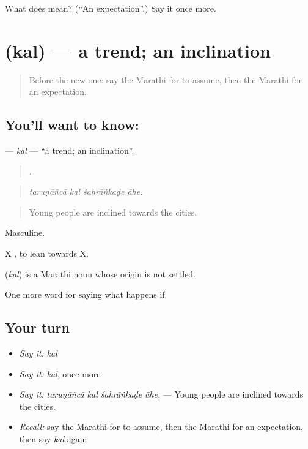 \begin{tcolorbox}[breakable,colback=teal!4,colframe=teal!35!black,title={Before you move on}]
What does  mean? (\textquotedblleft{}An expectation\textquotedblright{}.) Say it once more.
\end{tcolorbox}
\section[\texorpdfstring{\mr{कल} (kal)}{कल (kal)}]{ (kal) — a trend; an inclination}

\label{lesson:MR-C383-kal}



\begin{quote}
Before the new one: say the Marathi for to assume, then the Marathi for an expectation.
\end{quote}

\subsection*{You'll want to know: }
\textbf{} — \emph{kal} — \textquotedblleft{}a trend; an inclination\textquotedblright{}.

\begin{quote}
   .
\end{quote}

\begin{quote}
\emph{taruṇāñcā kal śahrāṅkaḍe āhe.}
\end{quote}

\begin{quote}
Young people are inclined towards the cities.
\end{quote}

Masculine.

X   , to lean towards X.

\begin{cousinweb}
\textbf{} (\emph{kal}) is a Marathi noun whose origin is not settled.
\end{cousinweb}

\begin{grammarlens}[title={What you've built}]
One more word for saying what happens if.
\end{grammarlens}

\subsection*{Your turn}
\begin{itemize}
\raggedright
  \item \emph{Say it:} \emph{kal}
  \item \emph{Say it:} \emph{kal}, once more
  \item \emph{Say it:} \emph{taruṇāñcā kal śahrāṅkaḍe āhe.} — Young people are inclined towards the cities.
  \item \emph{Recall:} say the Marathi for to assume, then the Marathi for an expectation, then say \emph{kal} again
\end{itemize}

